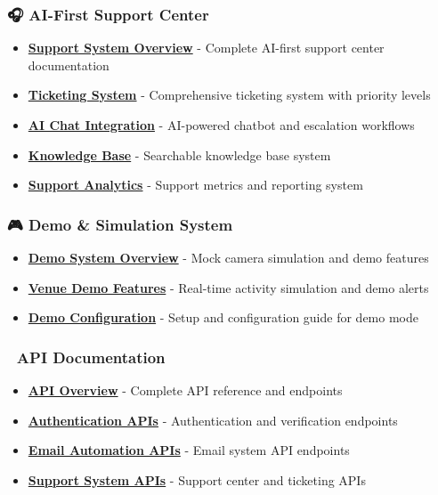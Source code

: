 \documentclass[11pt,a4paper]{article}
\begin{document}
\hypertarget{ai-first-support-center}{%
\subsubsection{🎧 AI-First Support
Center}\label{ai-first-support-center}}

\begin{itemize}
\tightlist
\item
  \textbf{\href{./support/overview.md}{Support System Overview}} -
  Complete AI-first support center documentation
\item
  \textbf{\href{./support/ticketing-system.md}{Ticketing System}} -
  Comprehensive ticketing system with priority levels
\item
  \textbf{\href{./support/ai-chat.md}{AI Chat Integration}} - AI-powered
  chatbot and escalation workflows
\item
  \textbf{\href{./support/knowledge-base.md}{Knowledge Base}} -
  Searchable knowledge base system
\item
  \textbf{\href{./support/analytics.md}{Support Analytics}} - Support
  metrics and reporting system
\end{itemize}

\hypertarget{demo-simulation-system}{%
\subsubsection{🎮 Demo \& Simulation
System}\label{demo-simulation-system}}

\begin{itemize}
\tightlist
\item
  \textbf{\href{./demo/overview.md}{Demo System Overview}} - Mock camera
  simulation and demo features
\item
  \textbf{\href{./demo/venue-features.md}{Venue Demo Features}} -
  Real-time activity simulation and demo alerts
\item
  \textbf{\href{./demo/configuration.md}{Demo Configuration}} - Setup
  and configuration guide for demo mode
\end{itemize}

\hypertarget{api-documentation}{%
\subsubsection{🔌 API Documentation}\label{api-documentation}}

\begin{itemize}
\tightlist
\item
  \textbf{\href{./api/overview.md}{API Overview}} - Complete API
  reference and endpoints
\item
  \textbf{\href{./api/authentication.md}{Authentication APIs}} -
  Authentication and verification endpoints
\item
  \textbf{\href{./api/email-automation.md}{Email Automation APIs}} -
  Email system API endpoints
\item
  \textbf{\href{./api/support-system.md}{Support System APIs}} - Support
  center and ticketing APIs
\end{itemize}
\end{document}
